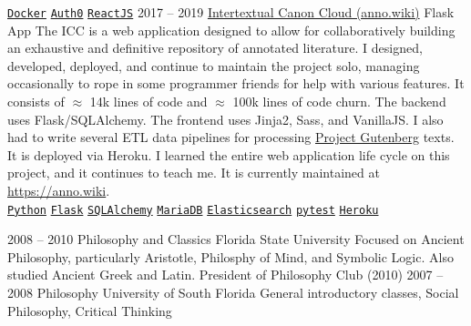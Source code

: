 \documentclass[9pt]{developercv} %
\begin{document}
\begin{entrylist}
{        \texttt{{\href{https://www.docker.com/}{Docker}}}\slashsep
        \texttt{{\href{https://auth0.com/}{Auth0}}}\slashsep
        \texttt{{\href{https://reactjs.org/}{ReactJS}}}
        }
    \entry
        {2017 -- 2019}
        {{\href{https://github.com/Anno-Wiki/icc}{Intertextual Canon Cloud (anno.wiki)}}}
        {Flask App}
        {
            The ICC is a web application designed to allow for collaboratively
            building an exhaustive and definitive repository of annotated
            literature. I designed, developed, deployed, and continue to
            maintain the project solo, managing occasionally to rope in some
            programmer friends for help with various features. It consists of
            $\approx$ 14k lines of code and $\approx$ 100k lines of code churn.
            The backend uses Flask/SQLAlchemy. The frontend uses Jinja2, Sass,
            and VanillaJS. I also had to write several ETL data pipelines for
            processing {\href{https://gutenberg.org}{Project Gutenberg}} texts.
            It is deployed via Heroku. I learned the entire web application life
            cycle on this project, and it continues to teach me. It is currently
            maintained at {\href{https://anno.wiki}{https://anno.wiki}}.
        \\
        \texttt{{\href{https://www.python.org/}{Python}}}\slashsep
        \texttt{{\href{https://flask.palletsprojects.com/en/1.1.x/}{Flask}}}\slashsep
        \texttt{{\href{https://www.sqlalchemy.org/}{SQLAlchemy}}}\slashsep
        \texttt{{\href{https://mariadb.org/}{MariaDB}}}\slashsep
        \texttt{{\href{https://www.elastic.co/}{Elasticsearch}}}\slashsep
        \texttt{{\href{https://docs.pytest.org/en/stable/}{pytest}}}\slashsep
        \texttt{{\href{https://www.heroku.com/}{Heroku}}}
        }
\end{entrylist}



\begin{entrylist}
    \entry
        {2008 -- 2010}
        {Philosophy and Classics}
        {Florida State University}
        {Focused on Ancient Philosophy, particularly Aristotle, Philosphy of
        Mind, and Symbolic Logic. Also studied Ancient Greek and Latin.
        President of Philosophy Club (2010)}
    \entry
        {2007 -- 2008}
        {Philosophy}
        {University of South Florida}
        {General introductory classes, Social Philosophy, Critical Thinking}
\end{entrylist}
\end{document}

